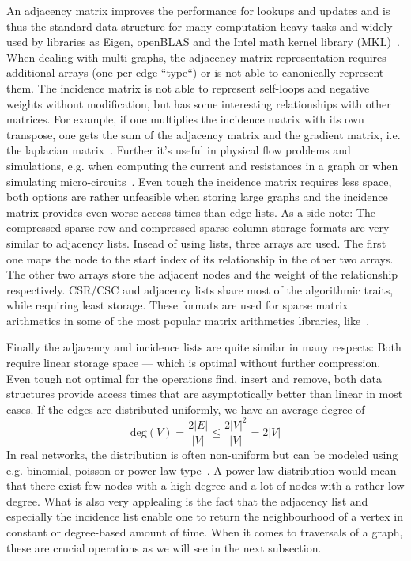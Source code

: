             An adjacency matrix improves the performance for lookups and updates and is thus the standard data structure for many computation heavy tasks and widely used by libraries as Eigen, openBLAS and the Intel math kernel library (MKL)~\autocite{MatrixStorageSchemes-2021-03-05, EigenTheMatrixclass-2020-12-05, MatrixStorageSchemes-1999-10-01}. 
            When dealing with multi-graphs, the adjacency matrix representation requires additional arrays (one per edge ``type``) or is not able to canonically represent them.       
            The incidence matrix is not able to represent self-loops and negative weights without modification, but has some interesting relationships with other matrices. 
            For example, if one multiplies the incidence matrix with its own transpose, one gets the sum of the adjacency matrix and the gradient matrix, i.e. the laplacian matrix~\autocite{brouwer2011spectra}. 
            Further it's useful in physical flow problems and simulations, e.g. when computing the current and resistances in a graph or when simulating micro-circuits~\autocite{weinberg1958kirchhoff}.
            Even tough the incidence matrix requires less space, both options are rather unfeasible when storing large graphs and the incidence matrix provides even worse access times than edge lists.        
            As a side note: The compressed sparse row and compressed sparse column storage formats are very similar to adjacency lists. 
            Insead of using lists, three arrays are used. 
            The first one maps the node to the start index of its relationship in the other two arrays. 
            The other two arrays store the adjacent nodes and the weight of the relationship respectively. 
            CSR/CSC and adjacency lists share most of the algorithmic traits, while requiring least storage. 
            These formats are used for sparse matrix arithmetics in some of the most popular matrix arithmetics libraries, like~\autocite{MatrixStorageSchemes-2021-03-05, EigenTheMatrixclass-2020-12-05, MatrixStorageSchemes-1999-10-01}. 
            
            Finally the adjacency and incidence lists are quite similar in many respects: Both require linear storage space --- which is optimal without further compression. 
            Even tough not optimal for the operations find, insert and remove, both data structures provide access times that are asymptotically better than linear in most cases.
            If the edges are distributed uniformly, we have an average degree of 
            \[ \text{deg}(V) = \frac{2|E|}{|V|} \leq \frac{2 |V|^2}{|V|} = 2 |V| \]
            In real networks, the distribution is often non-uniform but can be modeled using e.g. binomial, poisson or power law type~\autocite{holme2019rare}. 
            A power law distribution would mean that there exist few nodes with a high degree and a lot of nodes with a rather low degree. 
            What is also very applealing is the fact that the adjacency list and especially the incidence list enable one to return the neighbourhood of a vertex in constant or degree-based amount of time. 
            When it comes to traversals of a graph, these are crucial operations as we will see in the next subsection. 
            
